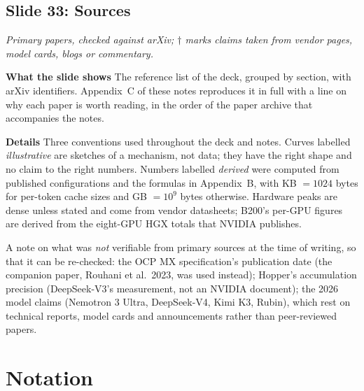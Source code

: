 \documentclass[11pt,letterpaper]{article}
\newcommand{\setstage}[1]{\colorlet{stagec}{#1}}
\newcommand{\slide}[3]{%
  \subsection[Slide #1: #2]{Slide #1: #2}%
  {\color{muted}\itshape #3\par}\medskip}
\newcommand{\para}[1]{\medskip\noindent\textbf{#1}\quad}
\begin{document}
\slide{33}{Sources}{Primary papers, checked against arXiv; $\dagger$ marks claims taken from vendor pages, model cards, blogs or commentary.}

\para{What the slide shows} The reference list of the deck, grouped by section, with arXiv identifiers. Appendix~C of these notes reproduces it in full with a line on why each paper is worth reading, in the order of the paper archive that accompanies the notes.

\para{Details} Three conventions used throughout the deck and notes. Curves labelled \emph{illustrative} are sketches of a mechanism, not data; they have the right shape and no claim to the right numbers. Numbers labelled \emph{derived} were computed from published configurations and the formulas in Appendix~B, with KB $=1024$ bytes for per-token cache sizes and GB $=10^9$ bytes otherwise. Hardware peaks are dense unless stated and come from vendor datasheets; B200's per-GPU figures are derived from the eight-GPU HGX totals that NVIDIA publishes.

A note on what was \emph{not} verifiable from primary sources at the time of writing, so that it can be re-checked: the OCP MX specification's publication date (the companion paper, Rouhani et al.\ 2023, was used instead); Hopper's accumulation precision (DeepSeek-V3's measurement, not an NVIDIA document); the 2026 model claims (Nemotron 3 Ultra, DeepSeek-V4, Kimi K3, Rubin), which rest on technical reports, model cards and announcements rather than peer-reviewed papers.
\clearpage
\appendix
\setstage{ink}
\section{Notation}
\end{document}
